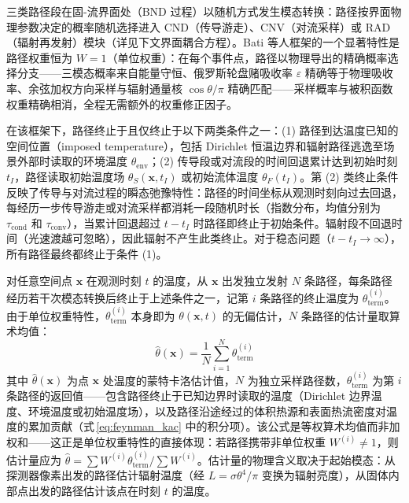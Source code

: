 三类路径段在固-流界面处（BND 过程）以随机方式发生模态转换：路径按界面物理参数决定的概率随机选择进入 CND（传导游走）、CNV（对流采样）或 RAD（辐射再发射）模块（详见下文界面耦合方程）。Bati 等人框架的一个显著特性是路径权重恒为 $W = 1$（单位权重）\cite{batiCouplingConductionConvection2023}：在每个事件点，路径以物理导出的精确概率选择分支——三模态概率来自能量守恒、俄罗斯轮盘赌吸收率 $\varepsilon$ 精确等于物理吸收率、余弦加权方向采样与辐射通量核 $\cos\theta / \pi$ 精确匹配——采样概率与被积函数权重精确相消，全程无需额外的权重修正因子。

在该框架下，路径终止于且仅终止于以下两类条件之一：(1) 路径到达温度已知的空间位置（imposed temperature），包括 Dirichlet 恒温边界和辐射路径逃逸至场景外部时读取的环境温度 $\theta_\text{env}$；(2) 传导段或对流段的时间回退累计达到初始时刻 $t_I$，路径读取初始温度场 $\theta_S(\mathbf{x}, t_I)$ 或初始流体温度 $\theta_F(t_I)$。第 (2) 类终止条件反映了传导与对流过程的瞬态弛豫特性：路径的时间坐标从观测时刻向过去回退，每经历一步传导游走或对流采样都消耗一段随机时长（指数分布，均值分别为 $\tau_\text{cond}$ 和 $\tau_\text{conv}$），当累计回退超过 $t - t_I$ 时路径即终止于初始条件。辐射段不回退时间（光速渡越可忽略），因此辐射不产生此类终止。对于稳态问题（$t - t_I \to \infty$），所有路径最终都终止于条件 (1)。

对任意空间点 $\mathbf{x}$ 在观测时刻 $t$ 的温度，从 $\mathbf{x}$ 出发独立发射 $N$ 条路径，每条路径经历若干次模态转换后终止于上述条件之一，记第 $i$ 条路径的终止温度为 $\theta_\text{term}^{(i)}$。由于单位权重特性，$\theta_\text{term}^{(i)}$ 本身即为 $\theta(\mathbf{x}, t)$ 的无偏估计，$N$ 条路径的估计量取算术均值：
\begin{equation}
    \hat{\theta}(\mathbf{x}) = \frac{1}{N}\sum_{i=1}^{N} \theta_\text{term}^{(i)}
    \label{eq:estimator}
\end{equation}
其中 $\hat{\theta}(\mathbf{x})$ 为点 $\mathbf{x}$ 处温度的蒙特卡洛估计值，$N$ 为独立采样路径数，$\theta_\text{term}^{(i)}$ 为第 $i$ 条路径的返回值——包含路径终止于已知边界时读取的温度（Dirichlet 边界温度、环境温度或初始温度场），以及路径沿途经过的体积热源和表面热流密度对温度的累加贡献（式\,\ref{eq:feynman_kac} 中的积分项）。该公式是等权算术均值而非加权和——这正是单位权重特性的直接体现：若路径携带非单位权重 $W^{(i)} \neq 1$，则估计量应为 $\hat{\theta} = \sum W^{(i)}\theta_\text{term}^{(i)} / \sum W^{(i)}$。估计量的物理含义取决于起始模态：从探测器像素出发的路径估计辐射温度（经 $L = \sigma\theta^4/\pi$ 变换为辐射亮度），从固体内部点出发的路径估计该点在时刻 $t$ 的温度。

